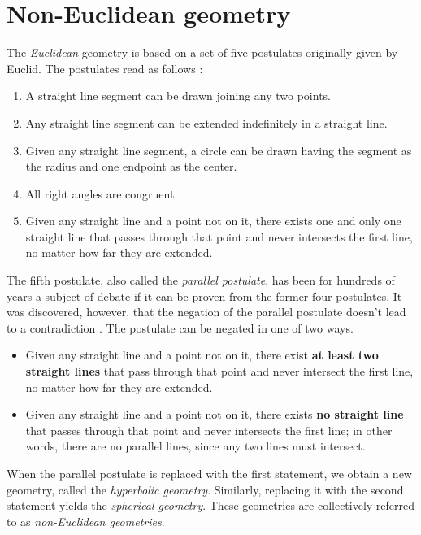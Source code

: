 \section{Non-Euclidean geometry} \label{sec:non_euclidean_geometry}

The \textit{Euclidean} geometry is based on a set of five postulates originally given by Euclid.
The postulates read as follows \cite{Weisstein-Postulates}:
\begin{enumerate}
    \item A straight line segment can be drawn joining any two points.
    \item Any straight line segment can be extended indefinitely in a straight line.
    \item Given any straight line segment, a circle can be drawn having the segment as the radius and one endpoint as the center.
    \item All right angles are congruent.
    \item Given any straight line and a point not on it, there exists one and only one straight line that passes through that point and never intersects the first line, no matter how far they are extended. \cite{Weisstein-Parallel}
\end{enumerate}
The fifth postulate, also called the \textit{parallel postulate}, has been for hundreds of years a subject of debate if it can be proven from the former four postulates.
It was discovered, however, that the negation of the parallel postulate doesn't lead to a contradiction \cite{Parallel-Postulate}.
The postulate can be negated in one of two ways.
\begin{itemize}
    \item Given any straight line and a point not on it, there exist \textbf{at least two straight lines} that pass through that point and never intersect the first line, no matter how far they are extended.
    \item Given any straight line and a point not on it, there exists \textbf{no straight line} that passes through that point and never intersects the first line; in other words, there are no parallel lines, since any two lines must intersect.
\end{itemize}

When the parallel postulate is replaced with the first statement, we obtain a new geometry, called the \textit{hyperbolic geometry}.
Similarly, replacing it with the second statement yields the \textit{spherical geometry}.
These geometries are collectively referred to as \textit{non-Euclidean geometries}.




